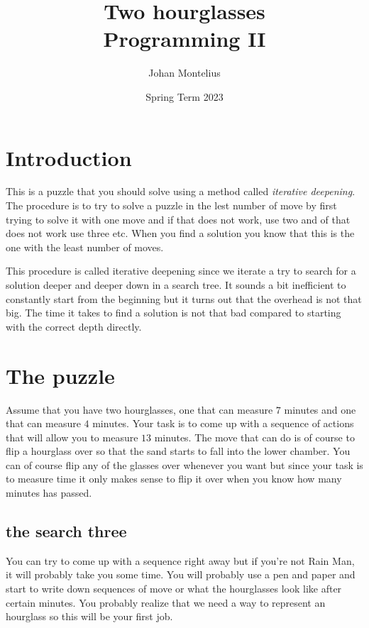 \documentclass[a4paper,11pt]{article}
\begin{document}
\title{
    \textbf{Two hourglasses}\\
    \large{Programming II}
}
\author{Johan Montelius}
\date{Spring Term 2023}
\maketitle
{}


\section*{Introduction}

This is a puzzle that you should solve using a method called {\em
  iterative deepening}. The procedure is to try to solve a puzzle in
the lest number of move by first trying to solve it with one move and
if that does not work, use two and of that does not work use three
etc. When you find a solution you know that this is the one with the
least number of moves.

This procedure is called iterative deepening since we iterate a try to
search for a solution deeper and deeper down in a search tree. It
sounds a bit inefficient to constantly start from the beginning but it
turns out that the overhead is not that big. The time it takes to find
a solution is not that bad compared to starting with the correct
depth directly.

\section*{The puzzle}

Assume that you have two hourglasses, one that can measure $7$ minutes
and one that can measure $4$ minutes. Your task is to come up with a
sequence of actions that will allow you to measure $13$ minutes. The
move that can do is of course to flip a hourglass over so that the
sand starts to fall into the lower chamber. You can of course flip any
of the glasses over whenever you want but since your task is to
measure time it only makes sense to flip it over when you know how
many minutes has passed.

\subsection*{the search three}

You can try to come up with a sequence right away but if you're not
Rain Man, it will probably take you some time. You will probably use a
pen and paper and start to write down sequences of move or what the
hourglasses look like after certain minutes. You probably realize that
we need a way to represent an hourglass so this will be your first job.
\end{document}
